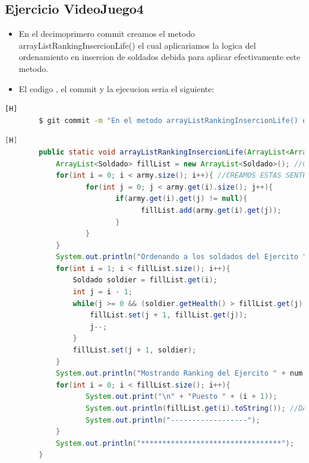 \documentclass{article}
\begin{document}
	\subsection{Ejercicio VideoJuego4}
	\begin{itemize}	
		\item En el decimoprimero commit creamos el metodo arrayListRankingInsercionLife() el cual aplicariamos la logica del ordenamiento en insercion de soldados debida para aplicar efectivamente este metodo.
		\item El codigo , el commit y la ejecucion seria el siguiente:
	\end{itemize}	
	\begin{lstlisting}[language=bash,caption={Commit}][H]
		$ git commit -m "En el metodo arrayListRankingInsercionLife() el cual aplicariamos la logica del ordenamiento en insercion de soldados debida para aplicar efectivamente este metodo"
	\end{lstlisting}	
	\begin{lstlisting}[language=java,caption={Las lineas de codigos del metodo creado:}][H]
		public static void arrayListRankingInsercionLife(ArrayList<ArrayList<Soldado>> army, int num){
			ArrayList<Soldado> fillList = new ArrayList<Soldado>(); //CREAMOS ESTE ARRAYLIST PARA PODER GUARDAR A LOS SOLDADOS EN UN SOLO ARRAYLIST EL CUAL SEA EFECTIVO EL METODO INSERCION 
			for(int i = 0; i < army.size(); i++){ //CREAMOS ESTAS SENTENCIAS PARA PODER VERIFICAR EL NUMERO DE SOLDADOS Y TAMBIEN ANADIRLO EN EL ARRAYLIST CREADO PARA DESPUES PONER EL RANKING DE PUESTOS DE CADA UNO DE ESTOS SOLDADOS
				   for(int j = 0; j < army.get(i).size(); j++){
						  if(army.get(i).get(j) != null){
								fillList.add(army.get(i).get(j));
						  }
				   }
			}
			System.out.println("Ordenando a los soldados del Ejercito " + num + " por el insercion: "); //APLICAMOS EL METODO INSERCION CON LOS PUNTOS DE VIDA
			for(int i = 1; i < fillList.size(); i++){
				Soldado soldier = fillList.get(i);
				int j = i - 1;
				while(j >= 0 && (soldier.getHealth() > fillList.get(j).getHealth())){ //APLICAMOS EL METODO INSERCION
					fillList.set(j + 1, fillList.get(j));
					j--;
				}
				fillList.set(j + 1, soldier);
			}
			System.out.println("Mostrando Ranking del Ejercito " + num + "....."); //MOSTRADOR DE RANKING DE LOS SOLDADOS
			for(int i = 0; i < fillList.size(); i++){
				   System.out.print("\n" + "Puesto " + (i + 1));
				   System.out.println(fillList.get(i).toString()); //DAMOS A CONOCER SUS DATOS Y EL PUESTO EN EL RANKING
				   System.out.println("------------------");
			}
			System.out.println("*********************************");
		}
	\end{lstlisting}
\end{document}
